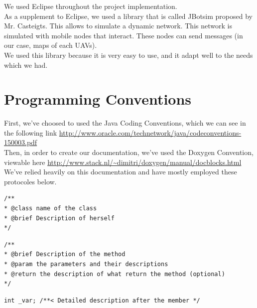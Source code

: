 We used Eclipse throughout the project implementation.\\

As a supplement to Eclipse, we used a library that is called JBotsim \cite{JBotSim} proposed by Mr. Casteigts. This allows to simulate a dynamic network. This network is simulated with mobile nodes that interact. These nodes can send messages (in our case, maps of each UAVs).\\

We used this library because it is very easy to use, and it adapt well to the needs which we had.

\section{Programming Conventions}

First, we've choosed to used the Java Coding Conventions, which we can see in the following link \url{http://www.oracle.com/technetwork/java/codeconventions-150003.pdf}\\

Then, in order to create our documentation, we've used the Doxygen Convention, viewable here \url{http://www.stack.nl/~dimitri/doxygen/manual/docblocks.html}\\
We've relied heavily on this documentation and have mostly employed these protocoles below.\\

\begin{lstlisting}[frame=trBL, title=Doxygen Convention for classes]
/**
* @class name of the class
* @brief Description of herself
*/
\end{lstlisting}

\begin{lstlisting}[frame=trBL, title=Doxygen Convention for methods]
/**
* @brief Description of the method
* @param the parameters and their descriptions
* @return the description of what return the method (optional)
*/
\end{lstlisting}

\begin{lstlisting}[frame=trBL, title=Doxygen Convention for members]
int _var; /**< Detailed description after the member */
\end{lstlisting}
~\\

